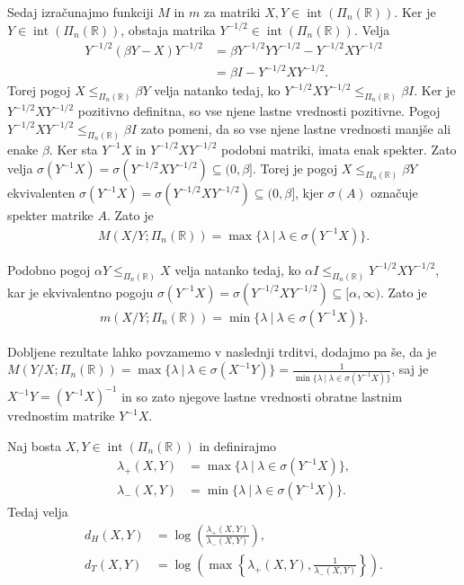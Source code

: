 \documentclass[mat2, tisk]{fmfdelo}
\newcommand{\R}{\mathbb{R}}
\begin{document}
Sedaj izračunajmo funkciji $M$ in $m$ za matriki
$X,Y\in\operatorname{int}(\Pi_n(\R))$. Ker je $Y \in \operatorname{int}(\Pi_n(\R))$, 
obstaja matrika $Y^{-1/2}\in\operatorname{int}(\Pi_n(\R))$. Velja
\[
\begin{aligned}
Y^{-1/2}(\beta Y-X)Y^{-1/2}
&=
\beta Y^{-1/2}YY^{-1/2}
-
Y^{-1/2}XY^{-1/2}\\
&=
\beta I-Y^{-1/2}XY^{-1/2}.
\end{aligned}
\]
Torej pogoj
$X\leq_{\Pi_n(\R)}\beta Y$ velja natanko tedaj, ko
$Y^{-1/2}XY^{-1/2}\leq_{\Pi_n(\R)}\beta I$.
Ker je $Y^{-1/2}XY^{-1/2}$ pozitivno definitna, so vse njene lastne
vrednosti pozitivne. Pogoj
$Y^{-1/2}XY^{-1/2}\leq_{\Pi_n(\R)}\beta I$ zato pomeni, da so vse njene
lastne vrednosti manjše ali enake $\beta$. Ker sta
$Y^{-1}X$ in $Y^{-1/2}XY^{-1/2}$ podobni matriki, imata enak spekter.
Zato velja
$\sigma(Y^{-1}X)=\sigma(Y^{-1/2}XY^{-1/2})\subseteq(0,\beta]$.
Torej je pogoj $X\leq_{\Pi_n(\R)}\beta Y$ ekvivalenten 
$\sigma(Y^{-1}X)
=
\sigma(Y^{-1/2}XY^{-1/2})
\subseteq(0,\beta]$,
kjer $\sigma(A)$ označuje spekter matrike $A$. Zato je
\begin{align*}
M(X/Y;\Pi_n(\R))
=
\max\limits\{\lambda ~|~ \lambda\in\sigma(Y^{-1}X)\}.
\end{align*}

Podobno pogoj
$\alpha Y\leq_{\Pi_n(\R)}X$ velja natanko tedaj, ko
$\alpha I\leq_{\Pi_n(\R)}Y^{-1/2}XY^{-1/2}$,
kar je ekvivalentno pogoju
$\sigma(Y^{-1}X)
=
\sigma(Y^{-1/2}XY^{-1/2})
\subseteq[\alpha,\infty)$.
Zato je
\begin{align*}
m(X/Y;\Pi_n(\R))
=
\min\limits\{\lambda ~|~ \lambda\in\sigma(Y^{-1}X)\}.
\end{align*}

Dobljene rezultate lahko povzamemo v naslednji trditvi, dodajmo pa še, da je
$M(Y/X;\Pi_n(\R))
=
\max\limits\{\lambda ~|~ \lambda\in\sigma(X^{-1}Y)\}
=
\frac{1}{\min\limits\{\lambda ~|~ \lambda\in\sigma(Y^{-1}X)\}}$,
saj je $X^{-1}Y=(Y^{-1}X)^{-1}$ in so zato njegove lastne vrednosti
obratne lastnim vrednostim matrike $Y^{-1}X$.

\begin{trditev}\label{trditev:metriki_psd}
Naj bosta $X,Y\in\operatorname{int}(\Pi_n(\R))$ in definirajmo
\begin{align*}
\lambda_+(X,Y)
&=
\max\limits
\{\lambda ~|~ \lambda\in\sigma(Y^{-1}X)\},\\
\lambda_-(X,Y)
&=
\min\limits
\{\lambda ~|~ \lambda\in\sigma(Y^{-1}X)\}.
\end{align*}
Tedaj velja
\begin{align*}
d_H(X,Y)
&=
\log\left(
\frac{\lambda_+(X,Y)}
{\lambda_-(X,Y)}
\right),\\
d_T(X,Y)
&=
\log\left(
\max\limits
\left\{
\lambda_+(X,Y),
\frac{1}{\lambda_-(X,Y)}
\right\}
\right).
\end{align*}
\end{trditev}
\end{document}
